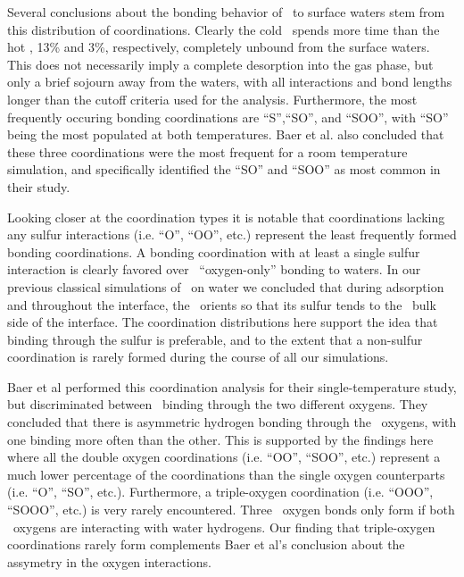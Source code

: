 	Several conclusions about the bonding behavior of \suldiox~to surface waters stem from this distribution of coordinations. Clearly the cold \suldiox~spends more time than the hot \suldiox, 13\% and 3\%, respectively, completely unbound from the surface waters. This does not necessarily imply a complete desorption into the gas phase, but only a brief sojourn away from the waters, with all interactions and bond lengths longer than the cutoff criteria used for the analysis. Furthermore, the most frequently occuring bonding coordinations are ``S'',``SO'', and ``SOO'', with ``SO'' being the most populated at both temperatures. Baer et al. also concluded that these three coordinations were the most frequent for a room temperature simulation, and specifically identified the ``SO'' and ``SOO'' as most common in their study.\cite{Baer2010}

	Looking closer at the coordination types it is notable that coordinations lacking any sulfur interactions (i.e. ``O'', ``OO'', etc.) represent the least frequently formed bonding coordinations. A bonding coordination with at least a single sulfur interaction is clearly favored over \suldiox~``oxygen-only'' bonding to waters. In our previous classical simulations of \suldiox~on water we concluded that during adsorption and throughout the interface, the \suldiox~orients so that its sulfur tends to the \wat~bulk side of the interface.\cite{Shamay2011} The coordination distributions here support the idea that binding through the sulfur is preferable, and to the extent that a non-sulfur coordination is rarely formed during the course of all our simulations.

Baer et al performed this coordination analysis for their single-temperature study, but discriminated between \suldiox~binding through the two different oxygens. They concluded that there is asymmetric hydrogen bonding through the \suldiox~oxygens, with one binding more often than the other. This is supported by the findings here where all the double oxygen coordinations (i.e. ``OO'', ``SOO'', etc.) represent a much lower percentage of the coordinations than the single oxygen counterparts (i.e. ``O'', ``SO'', etc.). Furthermore, a triple-oxygen coordination (i.e. ``OOO'', ``SOOO'', etc.) is very rarely encountered. Three \suldiox~oxygen bonds only form if both \suldiox~oxygens are interacting with water hydrogens. Our finding that triple-oxygen coordinations rarely form complements Baer et al's conclusion about the assymetry in the oxygen interactions.

